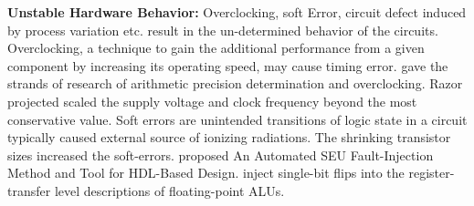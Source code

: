 \textbf{Unstable Hardware Behavior:} Overclocking, soft Error, circuit defect induced by process 
variation etc. result in the un-determined behavior of the circuits.  Overclocking, a technique to gain 
the additional performance from a given component by increasing its operating speed, may cause timing error. \cite{overclock_3} gave 
the strands of research of arithmetic precision determination and overclocking. Razor\cite{Razor_15}  projected scaled 
the supply voltage and clock frequency beyond the most conservative value. Soft errors are unintended 
transitions of logic state in a circuit typically caused external source of ionizing radiations. 
The shrinking transistor sizes increased the soft-errors. \cite{Mansour_20} proposed An Automated SEU 
Fault-Injection Method and Tool for HDL-Based Design. \cite{Subasi_30} inject single-bit flips into the register-transfer 
level descriptions of floating-point ALUs.


